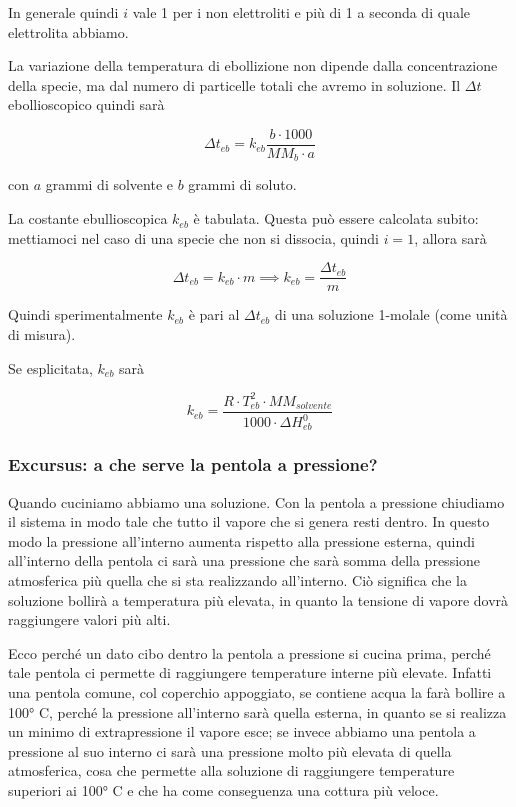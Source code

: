 In generale quindi $i$ vale 1 per i non elettroliti e più di 1 a seconda di quale elettrolita abbiamo.

\vspace{0.2cm}La variazione della temperatura di ebollizione non dipende dalla concentrazione della specie, ma dal numero di particelle totali che avremo in soluzione. Il $\Delta t$ ebollioscopico quindi sarà

$$\Delta t_{eb}=k_{eb} \frac{b \cdot 1000}{MM_b \cdot a}$$

con $a$ grammi di solvente e $b$ grammi di soluto.

La costante ebullioscopica $k_{eb}$ è tabulata. Questa può essere calcolata subito: mettiamoci nel caso di una specie che non si dissocia, quindi $i=1$, allora sarà

$$\Delta t_{eb}= k_{eb} \cdot m
\implies
k_{eb} = \frac{\Delta t_{eb}}{m}$$

Quindi sperimentalmente $k_{eb}$ è pari al $\Delta t_{eb}$ di una soluzione 1-molale (come unità di misura).

Se esplicitata, $k_{eb}$ sarà

$$k_{eb}=\frac{R \cdot T_{eb}^2 \cdot MM_{solvente}}{1000 \cdot \Delta H^0_{eb}}$$

\subsubsection{Excursus: a che serve la pentola a pressione?}
Quando cuciniamo abbiamo una soluzione. Con la pentola a pressione chiudiamo il sistema in modo tale che tutto il vapore che si genera resti dentro. In questo modo la pressione all'interno aumenta rispetto alla pressione esterna, quindi all'interno della pentola ci sarà una pressione che sarà somma della pressione atmosferica più quella che si sta realizzando all'interno. Ciò significa che la soluzione bollirà a temperatura più elevata, in quanto la tensione di vapore dovrà raggiungere valori più alti.

Ecco perché un dato cibo dentro la pentola a pressione si cucina prima, perché tale pentola ci permette di raggiungere temperature interne più elevate. Infatti una pentola comune, col coperchio appoggiato, se contiene acqua la farà bollire a 100° C, perché la pressione all'interno sarà quella esterna, in quanto se si realizza un minimo di extrapressione il vapore esce; se invece abbiamo una pentola a pressione al suo interno ci sarà una pressione molto più elevata di quella atmosferica, cosa che permette alla soluzione di raggiungere temperature superiori ai 100° C e che ha come conseguenza una cottura più veloce.
